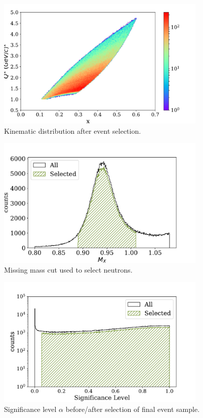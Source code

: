 \begin{figure}
  \begin{center}
    \includegraphics[width=10cm]{image/x_q2.pdf}
    \caption{Kinematic distribution after event selection.}
  \end{center}
\end{figure}

\begin{figure}
  \begin{center}
    \includegraphics[width=10cm]{image/missing_mass.pdf}
    \caption{Missing mass cut used to select neutrons.}
  \end{center}
\end{figure}

\begin{figure}
  \begin{center}
    \includegraphics[width=10cm]{image/significance.pdf}
    \caption{Significance level $\alpha$ before/after selection of final event sample.}
  \end{center}
\end{figure}

